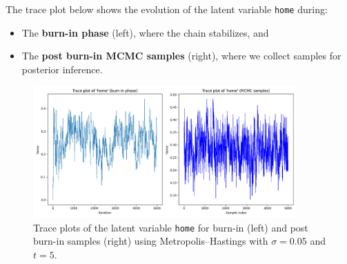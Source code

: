 \documentclass{article}
\begin{document}
\begin{enumerate}
The trace plot below shows the evolution of the latent variable \texttt{home} during:
\begin{itemize}
    \item The \textbf{burn-in phase} (left), where the chain stabilizes, and
    \item The \textbf{post burn-in MCMC samples} (right), where we collect samples for posterior inference.
\end{itemize}

\begin{figure}[H]
    \centering
    \includegraphics[width=0.9\textwidth]{home_trace_burnin_and_sampling.png}
    \caption{Trace plots of the latent variable \texttt{home} for burn-in (left) and post burn-in samples (right) using Metropolis--Hastings with $\sigma = 0.05$ and $t = 5$.}
    \label{fig:home-trace}
\end{figure}



\end{enumerate}
\end{document}
